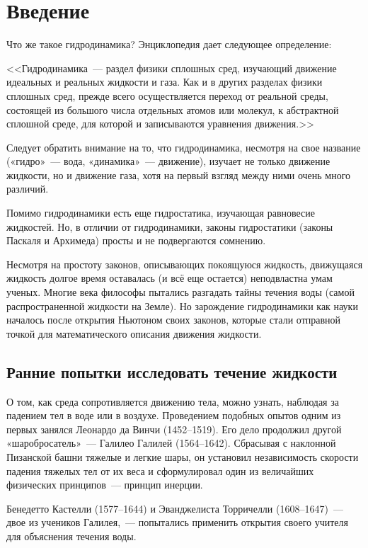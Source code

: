 \section{Введение}

Что же такое гидродинамика? Энциклопедия дает следующее определение:

<<Гидродинамика~--- раздел физики сплошных сред, изучающий движение идеальных и реальных жидкости и газа. Как и в других разделах физики сплошных сред, прежде всего осуществляется переход от реальной среды, состоящей из большого числа отдельных атомов или молекул, к абстрактной сплошной среде, для которой и записываются уравнения движения.>>

Следует обратить внимание на то, что гидродинамика, несмотря на свое название («гидро»~--- вода, «динамика»~--- движение), изучает не только движение жидкости, но и движение газа, хотя на первый взгляд между ними очень много различий.

Помимо гидродинамики есть еще гидростатика, изучающая равновесие жидкостей. Но, в отличии от гидродинамики, законы гидростатики (законы Паскаля и Архимеда) просты и не подвергаются сомнению.

Несмотря на простоту законов, описывающих покоящуюся жидкость, движущаяся жидкость долгое время оставалась (и всё еще остается) неподвластна умам ученых. Многие века философы пытались разгадать тайны течения воды (самой распространенной жидкости на Земле). Но зарождение гидродинамики как науки началось после открытия Ньютоном своих законов, которые стали отправной точкой для математического описания движения жидкости.

\subsection*{Ранние попытки исследовать течение жидкости}

О том, как среда сопротивляется движению тела, можно узнать, наблюдая за падением тел в воде или в воздухе. 
Проведением подобных опытов одним из первых занялся Леонардо да Винчи (1452--1519). 
Его дело продолжил другой «шаробросатель»~--- Галилео Галилей (1564--1642). 
Сбрасывая с наклонной Пизанской башни тяжелые и легкие шары, он установил независимость 
скорости падения тяжелых тел от их веса и сформулировал один из величайших физических принципов~--- принцип инерции.

Бенедетто Кастелли (1577--1644) и Эванджелиста Торричелли (1608--1647)~--- двое из учеников 
Галилея,~--- попытались применить открытия своего учителя для объяснения течения воды.

